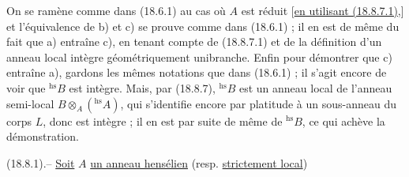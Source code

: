 On se ramène comme dans (18.6.1) au cas où $A$ est réduit [\uline{en utilisant (18.8.7.1),}] et l'équivalence de b) et c) se prouve comme dans (18.6.1) ; il en est de même du fait que a) entraîne c), en tenant compte de (18.8.7.1) et de la définition d'un anneau local intègre géométriquement unibranche. Enfin pour démontrer que c) entraîne a), gardons les mêmes notations que dans (18.6.1) ; il s'agit encore de voir que ${}^{\mathrm{hs}}B$ est intègre. Mais, par (18.8.7), ${}^{\mathrm{hs}}B$ est un anneau local de l'anneau semi-local $B\otimes_A({}^{\mathrm{hs}}A)$, qui s'identifie encore par platitude à un sous-anneau du corps $L$, donc est intègre ; il en est par suite de même de ${}^{\mathrm{hs}}B$, ce qui achève la démonstration.

  (18.8.1).-- \uline{Soit} $A$ \uline{un anneau  hensélien} (resp. \uline{strictement local})


